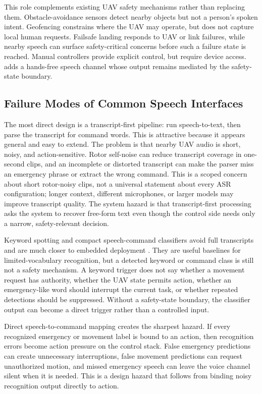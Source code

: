 This role complements existing UAV safety mechanisms rather than replacing them. Obstacle-avoidance sensors detect nearby objects but not a person's spoken intent. Geofencing constrains where the UAV may operate, but does not capture local human requests. Failsafe landing responds to UAV or link failures, while nearby speech can surface safety-critical concerns before such a failure state is reached. Manual controllers provide explicit control, but require device access. \sys{} adds a hands-free speech channel whose output remains mediated by the safety-state boundary.

\subsection{Failure Modes of Common Speech Interfaces}

The most direct design is a transcript-first pipeline: run speech-to-text, then parse the transcript for command words. This is attractive because it appears general and easy to extend. The problem is that nearby UAV audio is short, noisy, and action-sensitive. Rotor self-noise can reduce transcript coverage in one-second clips, and an incomplete or distorted transcript can make the parser miss an emergency phrase or extract the wrong command. This is a scoped concern about short rotor-noisy clips, not a universal statement about every ASR configuration; longer context, different microphones, or larger models may improve transcript quality. The system hazard is that transcript-first processing asks the system to recover free-form text even though the control side needs only a narrow, safety-relevant decision.

Keyword spotting and compact speech-command classifiers avoid full transcripts and are much closer to embedded deployment \cite{sainath2015cnn_kws,warden2018speechcommands,zhang2017helloedge}. They are useful baselines for limited-vocabulary recognition, but a detected keyword or command class is still not a safety mechanism. A keyword trigger does not say whether a movement request has authority, whether the UAV state permits action, whether an emergency-like word should interrupt the current task, or whether repeated detections should be suppressed. Without a safety-state boundary, the classifier output can become a direct trigger rather than a controlled input.

Direct speech-to-command mapping creates the sharpest hazard. If every recognized emergency or movement label is bound to an action, then recognition errors become action pressure on the control stack. False emergency predictions can create unnecessary interruptions, false movement predictions can request unauthorized motion, and missed emergency speech can leave the voice channel silent when it is needed. This is a design hazard that follows from binding noisy recognition output directly to action.

